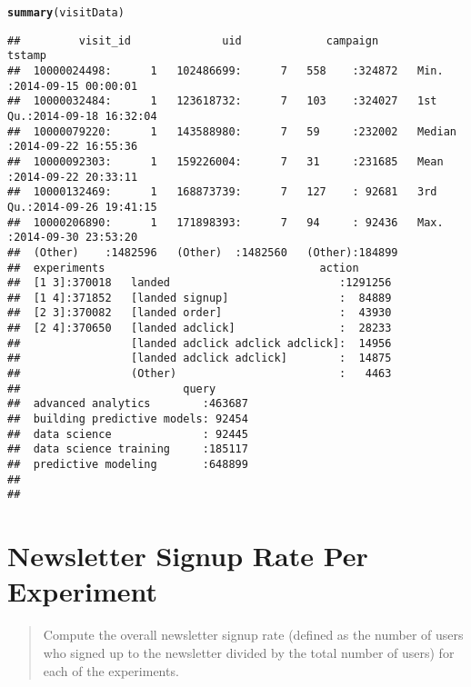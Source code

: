 \documentclass{article}\usepackage[]{graphicx}\usepackage[]{color}
\makeatletter
\newcommand{\hlstd}[1]{\textcolor[rgb]{0.345,0.345,0.345}{#1}}%
\newcommand{\hlkwd}[1]{\textcolor[rgb]{0.737,0.353,0.396}{\textbf{#1}}}%
\newenvironment{kframe}{%
 \def\at@end@of@kframe{}%
 \ifinner\ifhmode%
  \def\at@end@of@kframe{\end{minipage}}%
  \begin{minipage}{\columnwidth}%
 \fi\fi%
 \def\FrameCommand##1{\hskip\@totalleftmargin \hskip-\fboxsep
 \colorbox{shadecolor}{##1}\hskip-\fboxsep
     \hskip-\linewidth \hskip-\@totalleftmargin \hskip\columnwidth}%
 \MakeFramed {\advance\hsize-\width
   \@totalleftmargin\z@ \linewidth\hsize
   \@setminipage}}%
 {\par\unskip\endMakeFramed%
 \at@end@of@kframe}
\newenvironment{knitrout}{}{} %
\makeatother
\begin{document}
\begin{knitrout}
\color{fgcolor}\begin{kframe}
\begin{alltt}
\hlkwd{summary}\hlstd{(visitData)}
\end{alltt}
\begin{verbatim}
##         visit_id              uid             campaign          tstamp                   
##  10000024498:      1   102486699:      7   558    :324872   Min.   :2014-09-15 00:00:01  
##  10000032484:      1   123618732:      7   103    :324027   1st Qu.:2014-09-18 16:32:04  
##  10000079220:      1   143588980:      7   59     :232002   Median :2014-09-22 16:55:36  
##  10000092303:      1   159226004:      7   31     :231685   Mean   :2014-09-22 20:33:11  
##  10000132469:      1   168873739:      7   127    : 92681   3rd Qu.:2014-09-26 19:41:15  
##  10000206890:      1   171898393:      7   94     : 92436   Max.   :2014-09-30 23:53:20  
##  (Other)    :1482596   (Other)  :1482560   (Other):184899                                
##  experiments                                 action       
##  [1 3]:370018   landed                          :1291256  
##  [1 4]:371852   [landed signup]                 :  84889  
##  [2 3]:370082   [landed order]                  :  43930  
##  [2 4]:370650   [landed adclick]                :  28233  
##                 [landed adclick adclick adclick]:  14956  
##                 [landed adclick adclick]        :  14875  
##                 (Other)                         :   4463  
##                         query       
##  advanced analytics        :463687  
##  building predictive models: 92454  
##  data science              : 92445  
##  data science training     :185117  
##  predictive modeling       :648899  
##                                     
## 
\end{verbatim}
\end{kframe}
\end{knitrout}

\section{Newsletter Signup Rate Per Experiment}

\begin{quote}
Compute the overall newsletter signup rate (defined as the number of users who signed up to the newsletter divided by the total number of users) for each of the experiments.
\end{quote}
\end{document}

